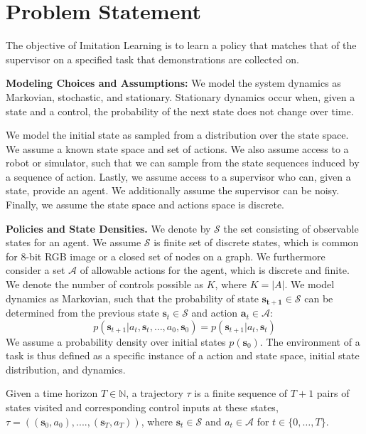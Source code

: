 \documentclass[conference]{article}
\newcommand{\bs}{\mathbf{s}}
\begin{document}
\section{Problem Statement}\label{sec:PS}
The objective of Imitation Learning is to learn a policy that matches that of the supervisor on a specified task that demonstrations are collected on.

\noindent\textbf{Modeling Choices and Assumptions:}  We model the system dynamics as Markovian, stochastic, and stationary. Stationary dynamics occur when, given a state and a control, the probability of the next state does not change over time. 

We model the initial state as sampled from a distribution over the state space.
We assume a known state space and set of actions. We also assume access to a robot or simulator, such that we can sample from the state sequences induced by a sequence of action.
Lastly, we assume access to a supervisor who can, given a state, provide an agent.
We additionally assume the supervisor can be noisy. Finally, we assume the state space and actions space is discrete. 

\noindent\textbf{Policies and State Densities.}
We denote by $\mathcal{S}$ the set consisting of observable  states for an agent. We assume $\mathcal{S}$ is finite set of discrete states, which is common for 8-bit RGB image or a closed set of nodes on a graph. 
We furthermore consider a set $\mathcal{A}$ of allowable actions  for the agent, which is discrete and finite. We denote the number of controls possible as $K$, where $K=|A|$.  We model dynamics as Markovian, such that the probability of state $\mathbf{s_{t+1}}\in
\mathcal{S}$ can be determined from the previous state $\mathbf{s}_t\in\mathcal{S}$ and action $\mathbf{a}_t\in
\mathcal{A}$: 
$$p(\bs_{t+1}| a_{t},\bs_{t}, \ldots, a_{0}, \bs_{0})=p(\bs_{t+1}|a_{t}, \bs_t)$$
We assume a probability density over initial states $p(\bs_0)$.
The environment of a task is thus defined as a specific instance of a action and state space, initial state distribution, and dynamics. 



Given a time horizon $T\in \mathbb{N}$, a trajectory $\tau$ is a finite sequence of $T+1$ pairs of states visited and corresponding
control inputs at these states, $\tau = ((\mathbf{s}_0,a_0), ...., (\mathbf{s}_T,a_T))$, where $\bs_t\in \mathcal{S}$
and $a_t\in \mathcal{A}$ for $t\in \{0, \ldots, T\}$.
\end{document}
